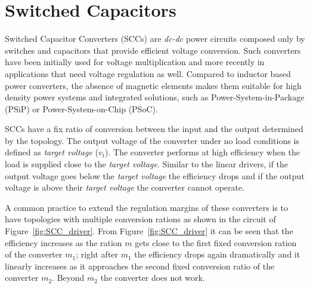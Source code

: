 \section{Switched Capacitors}
Switched Capacitor Converters (SCCs) are \emph{dc-dc} power circuits composed only by switches and capacitors that provide efficient voltage conversion. Such converters have been initially used for voltage multiplication and more recently in applications that need voltage regulation as well. Compared to inductor based power converters, the absence of magnetic elements makes them suitable for high density power systems and integrated solutions, such as Power-System-in-Package (PSiP) or Power-System-on-Chip (PSoC).

SCCs have a fix ratio of conversion between the input and the output determined by the topology. The output voltage of the converter under no load conditions is defined as \emph{target voltage} ($v_t$). The converter performs at high efficiency when the load is supplied close to the \emph{target voltage}. Similar to the linear drivers, if the output voltage goes below the \emph{target voltage} the efficiency drops and if the output voltage is above their \emph{target voltage} the converter cannot operate.

A common practice to extend the regulation margins of these converters is to have topologies with multiple conversion rations as shown in the circuit of Figure~\ref{fig:SCC_driver}. From Figure~\ref{fig:SCC_driver} it can be seen that the efficiency increases as the ration $m$ gets close to the first fixed conversion ration of the converter $m_1$; right after $m_1$ the efficiency drops again dramatically and it linearly increases as it approaches the second fixed conversion ratio of the converter $m_2$. Beyond $m_2$ the converter does not work.

